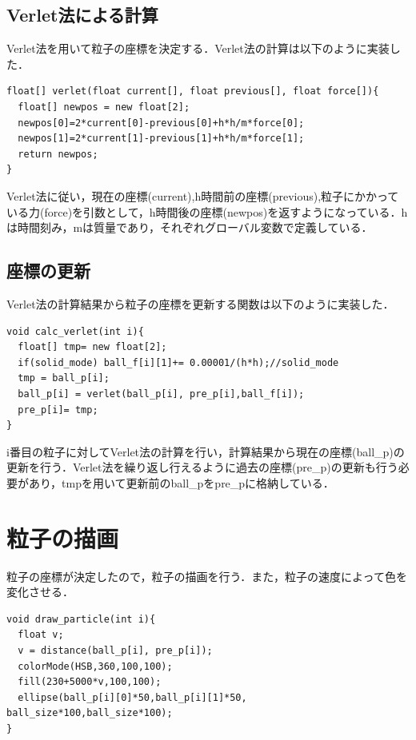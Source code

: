 \subsection{Verlet法による計算}
Verlet法を用いて粒子の座標を決定する．Verlet法の計算は以下のように実装した．
\begin{screen}
{\small
\begin{verbatim}
float[] verlet(float current[], float previous[], float force[]){
  float[] newpos = new float[2];
  newpos[0]=2*current[0]-previous[0]+h*h/m*force[0];
  newpos[1]=2*current[1]-previous[1]+h*h/m*force[1];
  return newpos;
} 
\end{verbatim}}
\end{screen}
Verlet法に従い，現在の座標(current),h時間前の座標(previous),粒子にかかっている力(force)を引数として，h時間後の座標(newpos)を返すようになっている．hは時間刻み，mは質量であり，それぞれグローバル変数で定義している．
\subsection{座標の更新}
Verlet法の計算結果から粒子の座標を更新する関数は以下のように実装した．
\begin{screen}
{\small
\begin{verbatim}
void calc_verlet(int i){
  float[] tmp= new float[2];
  if(solid_mode) ball_f[i][1]+= 0.00001/(h*h);//solid_mode
  tmp = ball_p[i];
  ball_p[i] = verlet(ball_p[i], pre_p[i],ball_f[i]);
  pre_p[i]= tmp; 
}
\end{verbatim}}
\end{screen}
i番目の粒子に対してVerlet法の計算を行い，計算結果から現在の座標(ball\_p)の更新を行う．Verlet法を繰り返し行えるように過去の座標(pre\_p)の更新も行う必要があり，tmpを用いて更新前のball\_pをpre\_pに格納している．

\section{粒子の描画}
粒子の座標が決定したので，粒子の描画を行う．また，粒子の速度によって色を変化させる．
\begin{screen}
{\small
\begin{verbatim}
void draw_particle(int i){
  float v;
  v = distance(ball_p[i], pre_p[i]);
  colorMode(HSB,360,100,100);
  fill(230+5000*v,100,100);  
  ellipse(ball_p[i][0]*50,ball_p[i][1]*50, ball_size*100,ball_size*100);
}
\end{verbatim}}
\end{screen}

